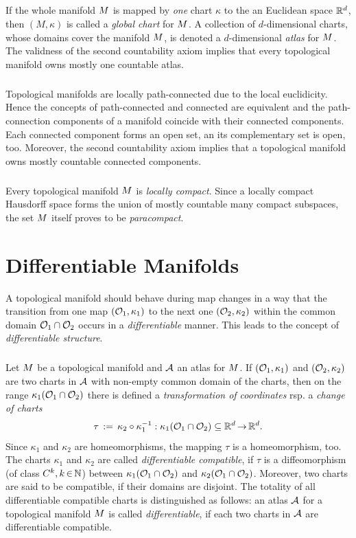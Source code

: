 \documentclass[11pt,twoside]{article}
\begin{document}
\subparagraph{}
If the whole manifold $\topM$ is mapped by \textit{one} chart $\kappa$
to the an Euclidean space $\Rd$,
then $(M,\kappa)$ is called a \textit{global chart} for $\topM$.
A collection of $d$-dimensional charts,
whose domains cover the manifold $\topM$,
is denoted a $d$-dimensional \textit{atlas} for $\topM$.
The validness of the second countability axiom implies
that every topological manifold owns mostly one countable atlas.

\subparagraph{}
Topological manifolds are locally path-connected
due to the local euclidicity.
Hence the concepts of path-connected and connected are equivalent
and the path-connection components of a manifold coincide with their connected components.
Each connected component forms an open set,
an its complementary set is open, too.
Moreover,
the second countability axiom implies
that a topological manifold owns mostly countable connected components.

\subparagraph{}
Every topological manifold $\topM$ is \textit{locally compact}.
Since a locally compact Hausdorff space forms the union
of mostly countable many compact subspaces, 
the set $\topM$ itself proves to be \textit{paracompact}.

\section{Differentiable Manifolds}
A topological manifold should behave during map changes in a way
that the transition from one map $(\openO_1,\kappa_1)$
to the next one $(\openO_2,\kappa_2)$
within the common domain $\openO_1 \cap \openO_2$ occurs
in a \textit{differentiable} manner.
This leads to the concept of \textit{differentiable structure}.

\subparagraph{}
Let $\topM$ be a topological manifold and $\cal{A}$ an atlas for $\topM$.
If $(\Off_1,\kappa_1)$ and $(\Off_2,\kappa_2)$ are two charts in $\cal{A}$
with non-empty common domain of the charts,
then on the range $\kappa_1(\Off_1 \cap \Off_2)$ there is defined
a \textit{transformation of coordinates} rsp. a \textit{change of charts}
\[
\tau \eqdef \kappa_2 \circ \kappa_1^{-1}: \kappa_1(\Off_1 \cap \Off_2)
\subseteq \Rd \xto \Rd.
\]
Since $\kappa_1$ and $\kappa_2$ are homeomorphisms,
the mapping $\tau$ is a homeomorphism,
too.
The charts $\kappa_1$ and $\kappa_2$ are called
\textit{differentiable compatible},
if $\tau$ is a diffeomorphism (of class $C^k, k \xeof \N$)
between $\kappa_1(\Off_1 \cap \Off_2)$ and $\kappa_2(\Off_1 \cap \Off_2)$.
Moreover, 
two charts are said to be compatible,
if their domains are disjoint.
The totality of all differentiable compatible charts
is distinguished as follows:
an atlas $\cal{A}$ for a topological manifold $\topM$
is called \textit{differentiable},
if each two charts in $\cal{A}$ are differentiable compatible.
\end{document}
